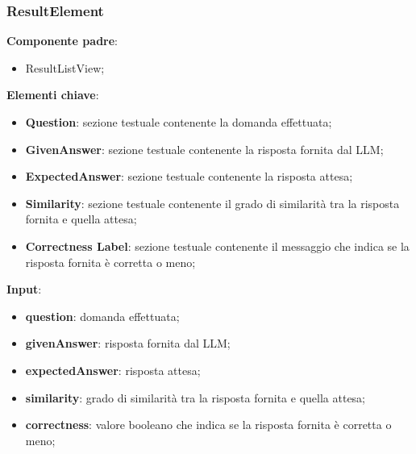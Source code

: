 \subsubsection{ResultElement}
\textbf{Componente padre}:
\begin{itemize}
    \item ResultListView;
\end{itemize}
\textbf{Elementi chiave}:
\begin{itemize}
    \item \textbf{Question}: sezione testuale contenente la domanda effettuata;
    \item \textbf{GivenAnswer}: sezione testuale contenente la risposta fornita dal LLM;
    \item \textbf{ExpectedAnswer}: sezione testuale contenente la risposta attesa;
    \item \textbf{Similarity}: sezione testuale contenente il grado di similarità tra la risposta fornita e quella attesa;
    \item \textbf{Correctness Label}: sezione testuale contenente il messaggio che indica se la risposta fornita è corretta o meno;
\end{itemize}
\textbf{Input}:
\begin{itemize}
    \item \textbf{question}: domanda effettuata;
    \item \textbf{givenAnswer}: risposta fornita dal LLM;
    \item \textbf{expectedAnswer}: risposta attesa;
    \item \textbf{similarity}: grado di similarità tra la risposta fornita e quella attesa;
    \item \textbf{correctness}: valore booleano che indica se la risposta fornita è corretta o meno;
\end{itemize}
